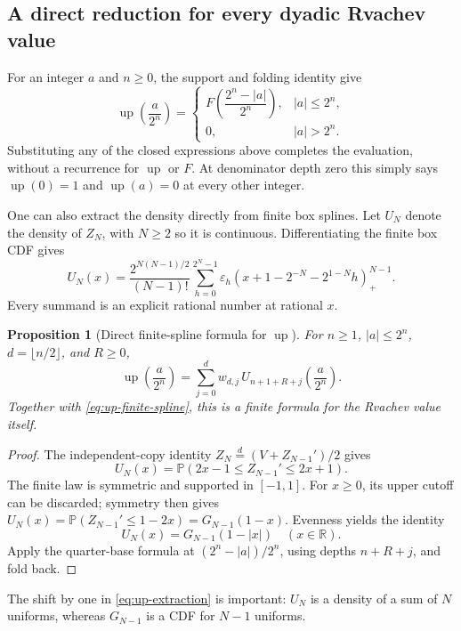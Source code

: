 \documentclass[11pt,a4paper]{article}
\numberwithin{equation}{section}
\newtheorem{proposition}[theorem]{Proposition}
\theoremstyle{definition}
\theoremstyle{remark}
\newcommand{\up}{\operatorname{up}}
\newcommand{\Pp}{\mathbb P}
\newcommand{\R}{\mathbb R}
\newcommand{\eps}{\varepsilon}
\newcommand{\pos}[1]{\left(#1\right)_+}
\begin{document}
\subsection{A direct reduction for every dyadic Rvachev value}
For an integer $a$ and $n\ge0$, the support and folding identity give
\begin{equation}
 \boxed{\displaystyle
 \up\!\left(\frac a{2^n}\right)=
 \begin{cases}
 F\!\left(\dfrac{2^n-|a|}{2^n}\right),&|a|\le2^n,\\[2mm]
 0,&|a|>2^n.
 \end{cases}}
 \label{eq:up-dyadic-fold}
\end{equation}
Substituting any of the closed expressions above completes the evaluation, without a recurrence for $\up$ or $F$. At denominator depth zero this simply says $\up(0)=1$ and $\up(a)=0$ at every other integer.

One can also extract the density directly from finite box splines. Let $U_N$ denote the density of $Z_N$, with $N\ge2$ so it is continuous. Differentiating the finite box CDF gives
\begin{equation}
 U_N(x)=\frac{2^{N(N-1)/2}}{(N-1)!}
   \sum_{h=0}^{2^N-1}\eps_h
   \pos{x+1-2^{-N}-2^{1-N}h}^{N-1}.
 \label{eq:up-finite-spline}
\end{equation}
Every summand is an explicit rational number at rational $x$.

\begin{proposition}[Direct finite-spline formula for $\up$]
\label{prop:up-extraction}
For $n\ge1$, $|a|\le2^n$, $d=\lfloor n/2\rfloor$, and $R\ge0$,
\begin{equation}
 \boxed{\displaystyle
 \up\!\left(\frac a{2^n}\right)
 =\sum_{j=0}^{d}w_{d,j}\,
 U_{n+1+R+j}\!\left(\frac a{2^n}\right).}
 \label{eq:up-extraction}
\end{equation}
Together with \cref{eq:up-finite-spline}, this is a finite formula for the Rvachev value itself.
\end{proposition}
\begin{proof}
The independent-copy identity $Z_N\overset d=(V+Z_{N-1}')/2$ gives
\[
 U_N(x)=\Pp(2x-1\le Z_{N-1}'\le2x+1).
\]
The finite law is symmetric and supported in $[-1,1]$. For $x\ge0$, its upper cutoff can be discarded; symmetry then gives
$U_N(x)=\Pp(Z_{N-1}'\le1-2x)=G_{N-1}(1-x)$.
Evenness yields the identity
\begin{equation}
 U_N(x)=G_{N-1}(1-|x|)\quad(x\in\R).
 \label{eq:finite-fold}
\end{equation}
Apply the quarter-base formula at $(2^n-|a|)/2^n$, using depths $n+R+j$, and fold back.
\end{proof}
The shift by one in \cref{eq:up-extraction} is important: $U_N$ is a density of a sum of $N$ uniforms, whereas $G_{N-1}$ is a CDF for $N-1$ uniforms.
\end{document}
